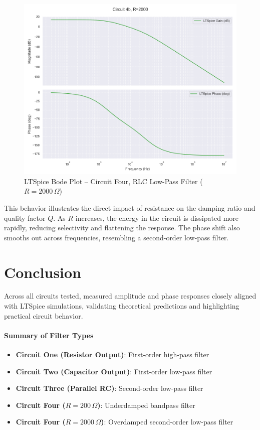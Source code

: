 \documentclass[12pt]{article}
\begin{document}
\begin{figure}[H]
	\centering
	\includegraphics[width=\textwidth]{e6_bode5}
	\caption{LTSpice Bode Plot – Circuit Four, RLC Low-Pass Filter ($R = 2000\,\Omega$)}
	\label{fig:rlc_lp}
\end{figure}

This behavior illustrates the direct impact of resistance on the damping ratio and quality factor \( Q \). As $R$ increases, the energy in the circuit is dissipated more rapidly, reducing selectivity and flattening the response. The phase shift also smooths out across frequencies, resembling a second-order low-pass filter.

\section{Conclusion}

Across all circuits tested, measured amplitude and phase responses closely aligned with LTSpice simulations, validating theoretical predictions and highlighting practical circuit behavior.

\paragraph{Summary of Filter Types}
\begin{itemize}
	\item \textbf{Circuit One (Resistor Output)}: First-order high-pass filter
	\item \textbf{Circuit Two (Capacitor Output)}: First-order low-pass filter
	\item \textbf{Circuit Three (Parallel RC)}: Second-order low-pass filter
	\item \textbf{Circuit Four ($R = 200\,\Omega$)}: Underdamped bandpass filter
	\item \textbf{Circuit Four ($R = 2000\,\Omega$)}: Overdamped second-order low-pass filter
\end{itemize}
\end{document}
